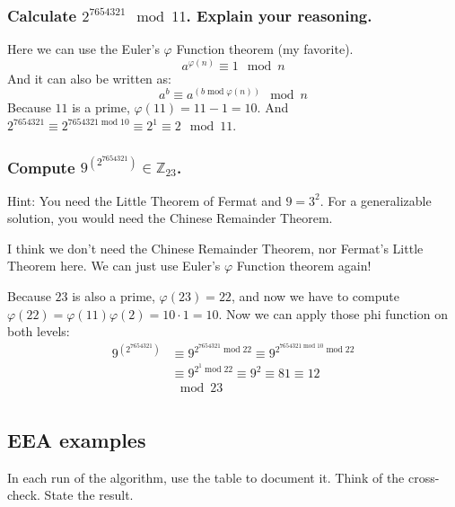 \documentclass{article}
\let\phi\varphi
\newcommand{\Z}{\mathbb{Z}}
\begin{document}
  \subsubsection{Calculate $2^{7654321} \mod 11$. Explain your reasoning.}
  Here we can use the Euler's $\phi$ Function theorem (my favorite).
  \[ a^{\phi(n)} \equiv 1 \mod n \]
  And it can also be written as:
  \[ a^b \equiv a^{(b \operatorname{mod} \phi(n))} \mod n \]
  Because $11$ is a prime, $\phi(11) = 11 - 1 = 10$.
  And $2^{7654321} \equiv 2^{7654321 \operatorname{mod} 10} \equiv 2^1 \equiv 2 \mod 11$.

  \subsubsection{Compute $9^{(2^{7654321})} \in \Z_{23}$.}
  \begin{centerframebox}
    Hint: You need the Little Theorem of Fermat and $9 = 3^2$.
    For a generalizable solution, you would need the Chinese Remainder Theorem.
  \end{centerframebox}
  I think we don't need the Chinese Remainder Theorem, nor Fermat's Little Theorem here.
  We can just use Euler's $\phi$ Function theorem again!

  Because $23$ is also a prime, $\phi(23) = 22$, and now we have to compute $\phi(22) = \phi(11)\phi(2) = 10 \cdot 1 = 10$.
  Now we can apply those phi function on both levels:
  \begin{align*}
    9^{(2^{7654321})}
    &\equiv 9^{2^{7654321} \operatorname{mod} 22} \equiv 9^{2^{7654321 \operatorname{mod} 10} \operatorname{mod} 22} \\
    &\equiv 9^{2^1 \operatorname{mod} 22} \equiv 9^2 \equiv 81 \equiv 12 \\
    &\mod 23\\
  \end{align*}

  \subsection{EEA examples}
  \begin{centerframebox}
    In each run of the algorithm, use the table to document it. Think of the cross-check. State the result.
  \end{centerframebox}
\end{document}
